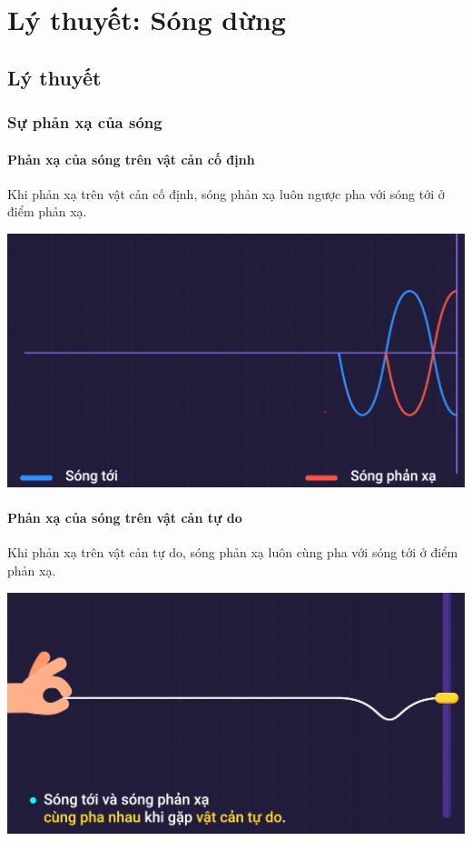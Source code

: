 
\chapter[Lý thuyết: Sóng dừng]{Lý thuyết: Sóng dừng}
\section{Lý thuyết}
\subsection{Sự phản xạ của sóng}
\subsubsection{Phản xạ của sóng trên vật cản cố định}
Khi phản xạ trên vật cản cố định, sóng phản xạ luôn ngược pha với sóng tới ở điểm phản xạ.
\begin{center}
	\includegraphics[scale=0.3]{../figs/VN12-PH-12-L-007-1-V2-1.png}
\end{center}
\subsubsection{Phản xạ của sóng trên vật cản tự do}		
Khi phản xạ trên vật cản tự do, sóng phản xạ luôn cùng pha với sóng tới ở điểm phản xạ.
\begin{center}
	\includegraphics[scale=0.3]{../figs/VN12-PH-12-L-007-1-V2-2.png}
\end{center}
